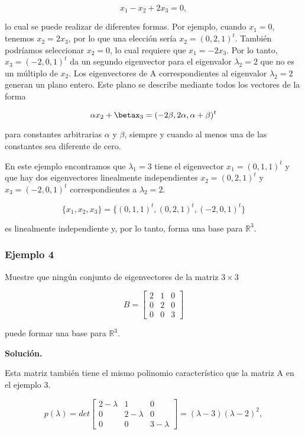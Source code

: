 \documentclass{report}
\numberwithin{subsection}{section} %
\begin{document}
    $$x_1 - x_2 + 2x_3 = 0,$$

    lo cual se puede realizar de diferentes formas. Por ejemplo, cuando $x_1 = 0$, tenemos $x_2 = 2x_3$, por lo que una elección sería $x_2 = (0, 2, 1)^t$. También podríamos seleccionar $x_2 = 0$, lo cual requiere que $x_1 = -2x_3$. Por lo tanto, $x_3 = (-2, 0, 1)^t$ da un segundo eigenvector para el eigenvalor $\lambda_2 = 2$ que no es un múltiplo de $x_2$. Los eigenvectores de A correspondientes al eigenvalor $\lambda_2 = 2$ generan un plano entero. Este plano se describe mediante todos los vectores de la forma

    $$\alpha x_2 + \betax_3 = (-2\beta, 2\alpha , \alpha  + \beta)^t$$

    para constantes arbitrarias $\alpha$ y $\beta$, siempre y cuando al menos una de las constantes sea diferente de cero.

    En este ejemplo encontramos que $\lambda_1 = 3$ tiene el eigenvector $x_1 = (0, 1, 1)^t$ y que hay dos eigenvectores linealmente independientes $x_2 = (0, 2, 1)^t$ y $x_3 = (-2, 0, 1)^t$ correspondientes a $\lambda_2 = 2$.

    $$\{ x_1, x_2, x_3\} = \{(0, 1, 1)^t, (0, 2, 1)^t, (-2, 0, 1)^t \}$$

    es linealmente independiente y, por lo tanto, forma una base para $\mathbb{R}^3$.

\subsubsection*{Ejemplo 4}

Muestre que ningún conjunto de eigenvectores de la matriz $3 \times 3$
    
    $$B = \begin{bmatrix}
        2 & 1 & 0 \\
        0 & 2 & 0 \\
        0 & 0 & 3
    \end{bmatrix}$$

    puede formar una base para $\mathbb{R}^3$.

    {\bf Solución.}

    Esta matriz también tiene el mismo polinomio característico que la matriz A en el ejemplo 3.

    $$p(\lambda) = det\begin{bmatrix}
                        2-\lambda & 1 & 0 \\
                        0 & 2-\lambda & 0 \\
                        0 & 0 & 3-\lambda
                    \end{bmatrix} = (\lambda  - 3)(\lambda  - 2)^2,$$
\end{document}
